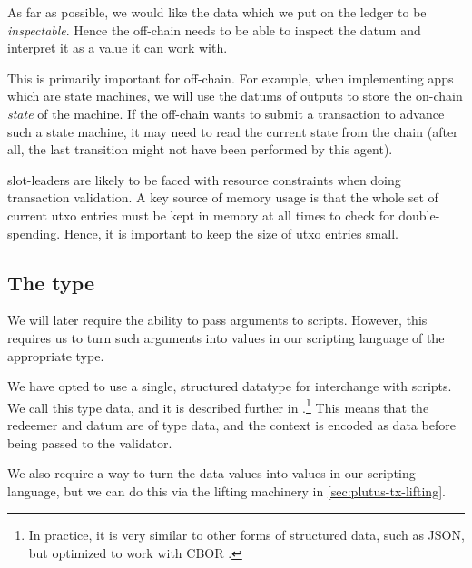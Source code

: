 \begin{requirement}[Inspectability]
\label{req:ledger-inspectability}
As far as possible, we would like the data which we put on the ledger to be \emph{inspectable}.
Hence the \gls{off-chain} needs to be able to inspect the \gls{datum} and interpret it as a value it can work with.

This is primarily important for \gls{off-chain}.
For example, when implementing \glspl{app} which are state machines, we will use the \glspl{datum} of outputs to store the on-chain \emph{state} of the machine.
If the \gls{off-chain} wants to submit a transaction to advance such a state machine, it may need to read the current state from the chain (after all, the last transition might not have been performed by this agent).
\end{requirement}

\begin{requirement}
\label{req:ledger-utxo-size}
\Glspl{slot-leader} are likely to be faced with resource constraints when doing transaction validation.
A key source of memory usage is that the whole set of current \gls{utxo} entries must be kept in memory at all times to check for double-spending.
Hence, it is important to keep the size of \gls{utxo} entries small.
\end{requirement}

\subsection{The  type}
\label{sec:data}

We will later require the ability to pass arguments to \glspl{script}.
However, this requires us to turn such arguments into values in our scripting language of the appropriate type.

We have opted to use a single, structured datatype for interchange with \glspl{script}.
We call this type \gls{data}, and it is described further in \textcite{eutxo}.\footnote{
  In practice, it is very similar to other forms of structured data, such as JSON, but optimized to work with CBOR \autocite{cbor}.
}
This means that the \gls{redeemer} and \gls{datum} are of type \gls{data}, and the \gls{context} is encoded as \gls{data} before being passed to the \gls{validator}.

We also require a way to turn the \gls{data} values into values in our scripting language, but we can do this via the lifting machinery in \cref{sec:plutus-tx-lifting}.


